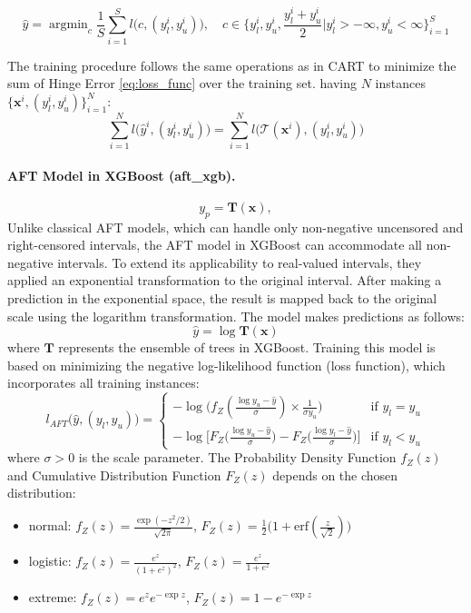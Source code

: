 \documentclass[12pt]{article}
\DeclareMathOperator*{\argmin}{argmin}
\begin{document}
\begin{equation}
    \hat{y} = \argmin_c \frac{1}{S} \sum_{i=1}^{S} l\big(c, (y_l^i, y_u^i)\big), \quad c \in \{y_l^i, y_u^i, \frac{y_l^i + y_u^i}{2}|y_l^i > -\infty, y_u^i < \infty\}_{i = 1}^S
\end{equation}

\noindent The training procedure follows the same operations as in CART to minimize the sum of Hinge Error \eqref{eq:loss_func} over the training set.
having $N$ instances $\{\mathbf{x}^i, (y_l^i, y_u^i)\}_{i=1}^N$:
\begin{equation*}
    \sum_{i = 1}^N l\Big(\hat{y}^i, (y_l^i, y_u^i)\Big) = \sum_{i = 1}^N l\Big(\mathcal{T}(\mathbf{x}^i), (y_l^i, y_u^i)\Big)
\end{equation*}

\paragraph{AFT Model in XGBoost (aft\_xgb).}

\[
y_p = \mathbf{T}(\mathbf{x}),
\]
Unlike classical AFT models, which can handle only non-negative uncensored and right-censored intervals, the AFT model in XGBoost \citep{aft_xgboost} can accommodate all non-negative intervals.
To extend its applicability to real-valued intervals, they applied an exponential transformation to the original interval.
After making a prediction in the exponential space, the result is mapped back to the original scale using the logarithm transformation.
The model makes predictions as follows:  
$$\hat{y} = \log \mathbf{T}(\mathbf{x})$$
where $\mathbf{T}$ represents the ensemble of trees in XGBoost.
Training this model is based on minimizing the negative log-likelihood function (loss function), which incorporates all training instances:
\begin{equation}
l_{AFT}\Big(\hat{y}, (y_l, y_u)\Big)=
    \begin{cases}
      -\log \big(f_Z(\frac{\log y_u - \hat{y}}{\sigma})\times \frac{1}{\sigma y_u}\big) &\text{if $y_l = y_u$}\\
      -\log \Big[ F_Z\big( \frac{\log y_u - \hat{y}}{\sigma} \big) - F_Z\big(\frac{\log y_l - \hat{y}}{\sigma}\big) \Big] &\text{if $y_l < y_u$}
    \end{cases}
\end{equation}
\noindent where $\sigma > 0$ is the scale parameter.
The Probability Density Function $f_Z(z)$ and Cumulative Distribution Function $F_Z(z)$ depends on the chosen distribution:
\begin{itemize}
    \item normal: $f_Z(z) = \frac{\exp (-z^2/2)}{\sqrt{2\pi}}$, \phantom{00}  $F_Z(z) = \frac{1}{2}\big( 1 + \text{erf}(\frac{z}{\sqrt{2}}) \big)$
    \item logistic: $f_Z(z) = \frac{e^z}{(1+e^z)^2}$, \phantom{0000} $F_Z(z) = \frac{e^z}{1+e^z}$
    \item extreme: $f_Z(z) = e^ze^{-\exp z}$, \phantom{0} $F_Z(z) = 1 - e^{-\exp z}$
\end{itemize}
\end{document}
